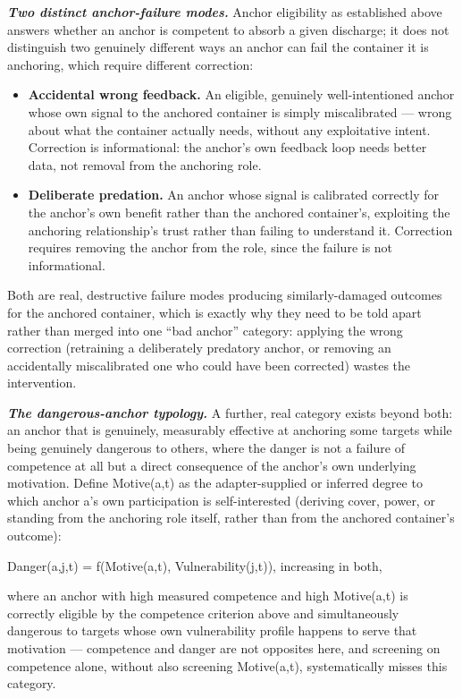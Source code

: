 \documentclass[
]{article}
\begin{document}
\emph{\textbf{Two distinct anchor-failure modes.}} Anchor eligibility as
established above answers whether an anchor is competent to absorb a
given discharge; it does not distinguish two genuinely different ways an
anchor can fail the container it is anchoring, which require different
correction:

\begin{itemize}
\item
  \textbf{Accidental wrong feedback.} An eligible, genuinely
  well-intentioned anchor whose own signal to the anchored container is
  simply miscalibrated --- wrong about what the container actually
  needs, without any exploitative intent. Correction is informational:
  the anchor's own feedback loop needs better data, not removal from the
  anchoring role.
\item
  \textbf{Deliberate predation.} An anchor whose signal is calibrated
  correctly for the anchor's own benefit rather than the anchored
  container's, exploiting the anchoring relationship's trust rather than
  failing to understand it. Correction requires removing the anchor from
  the role, since the failure is not informational.
\end{itemize}

Both are real, destructive failure modes producing similarly-damaged
outcomes for the anchored container, which is exactly why they need to
be told apart rather than merged into one ``bad anchor'' category:
applying the wrong correction (retraining a deliberately predatory
anchor, or removing an accidentally miscalibrated one who could have
been corrected) wastes the intervention.

\emph{\textbf{The dangerous-anchor typology.}} A further, real category
exists beyond both: an anchor that is genuinely, measurably effective at
anchoring some targets while being genuinely dangerous to others, where
the danger is not a failure of competence at all but a direct
consequence of the anchor's own underlying motivation. Define
Motive(a,t) as the adapter-supplied or inferred degree to which anchor
a's own participation is self-interested (deriving cover, power, or
standing from the anchoring role itself, rather than from the anchored
container's outcome):

Danger(a,j,t) = f(Motive(a,t), Vulnerability(j,t)), increasing in both,

where an anchor with high measured competence and high Motive(a,t) is
correctly eligible by the competence criterion above and simultaneously
dangerous to targets whose own vulnerability profile happens to serve
that motivation --- competence and danger are not opposites here, and
screening on competence alone, without also screening Motive(a,t),
systematically misses this category.
\end{document}
